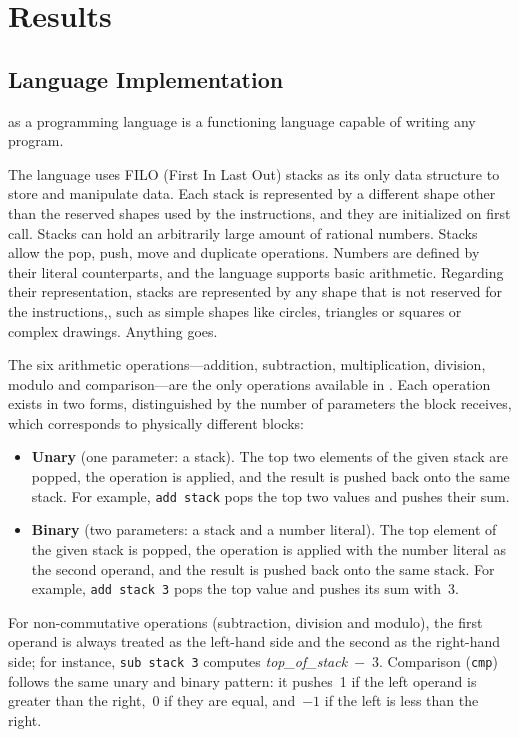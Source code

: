 
\chapter{Results}
\label{cha:results}

\section{Language Implementation}
\label{sec:results:language}

\sculpt as a programming language is a functioning language capable of writing any program.

The language uses FILO (First In Last Out) stacks as its only data structure to store and manipulate data. Each stack is represented by a different shape other than the reserved shapes used by the instructions, and they are initialized on first call.
Stacks can hold an arbitrarily large amount of rational numbers.
Stacks allow the pop, push, move and duplicate operations.
Numbers are defined by their literal counterparts, and the language supports basic arithmetic.
Regarding their representation, stacks are represented by any shape that is not reserved for the instructions,, such as simple shapes like circles, triangles or squares or complex drawings. Anything goes.

The six arithmetic operations---addition, subtraction, multiplication, division, modulo and comparison---are the only operations available in \sculpt.
Each operation exists in two forms, distinguished by the number of parameters the block receives, which corresponds to physically different blocks:

\begin{itemize}
    \item \textbf{Unary} (one parameter: a stack). The top two elements of the given stack are popped, the operation is applied, and the result is pushed back onto the same stack. For example, \texttt{add stack} pops the top two values and pushes their sum.
    \item \textbf{Binary} (two parameters: a stack and a number literal). The top element of the given stack is popped, the operation is applied with the number literal as the second operand, and the result is pushed back onto the same stack. For example, \texttt{add stack 3} pops the top value and pushes its sum with~3.
\end{itemize}

For non-commutative operations (subtraction, division and modulo), the first operand is always treated as the left-hand side and the second as the right-hand side; for instance, \texttt{sub stack 3} computes \emph{top\_of\_stack}~$-$~3.
Comparison (\texttt{cmp}) follows the same unary and binary pattern: it pushes~1 if the left operand is greater than the right,~0 if they are equal, and~$-1$ if the left is less than the right.

